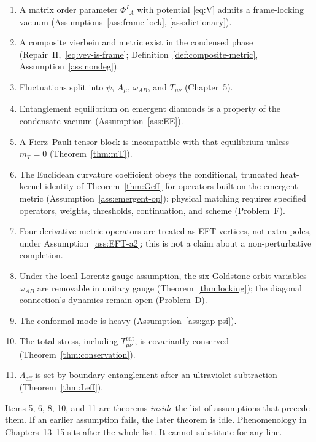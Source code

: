 \begin{enumerate}
  \item A matrix order parameter \(\Phi^I{}_A\) with potential
        \eqref{eq:V} admits a frame-locking vacuum
        (Assumptions~\ref{ass:frame-lock}, \ref{ass:dictionary}).
  \item A composite vierbein and metric exist in the condensed
        phase (Repair~II,~\eqref{eq:vev-is-frame};
        Definition~\ref{def:composite-metric},
        Assumption~\ref{ass:nondeg}).
  \item Fluctuations split into \(\psi\), \(A_\mu\), \(\omega_{AB}\),
        and \(T_{\mu\nu}\) (Chapter~5).
  \item Entanglement equilibrium on emergent diamonds is a property
        of the condensate vacuum (Assumption~\ref{ass:EE}).
  \item A Fierz--Pauli tensor block is incompatible with that
        equilibrium unless \(m_T=0\) (Theorem~\ref{thm:mT}).
  \item The Euclidean curvature coefficient obeys the conditional,
        truncated heat-kernel identity of Theorem~\ref{thm:Geff} for
        operators built on the emergent metric
        (Assumption~\ref{ass:emergent-op}); physical matching requires
        specified operators, weights, thresholds, continuation, and
        scheme (Problem~F).
  \item Four-derivative metric operators are treated as EFT vertices,
        not extra poles, under Assumption~\ref{ass:EFT-a2}; this is
        not a claim about a non-perturbative completion.
  \item Under the local Lorentz gauge assumption, the six Goldstone
        orbit variables \(\omega_{AB}\) are removable in unitary
        gauge (Theorem~\ref{thm:locking}); the diagonal connection's
        dynamics remain open (Problem~D).
  \item The conformal mode is heavy (Assumption~\ref{ass:gap-psi}).
  \item The total stress, including \(T_{\mu\nu}^{\mathrm{ent}}\),
        is covariantly conserved (Theorem~\ref{thm:conservation}).
  \item \(\Lambda_{\mathrm{eff}}\) is set by boundary entanglement
        after an ultraviolet subtraction (Theorem~\ref{thm:Leff}).
\end{enumerate}

Items 5, 6, 8, 10, and 11 are theorems \emph{inside} the list of
assumptions that precede them. If an earlier assumption fails, the
later theorem is idle. Phenomenology in Chapters~13--15 sits after
the whole list. It cannot substitute for any line.

